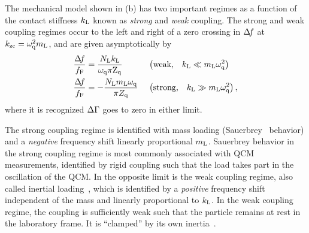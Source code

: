 The mechanical model shown in (b) has
two important regimes as a function of the contact stiffness $k_\mathrm{L}$ known
as \textit{strong} and \textit{weak} coupling.  The strong and weak
coupling regimes occur to the left and right of a zero crossing in $\Delta\!f$ at
$k_\mathrm{zc}=\omega_\mathrm{q}^2 m_\mathrm{L}$, and are given asymptotically by
\begin{align}
\frac{\Delta\!f}{f_\mathrm{F}}&=
\frac{N_\mathrm{L} k_\mathrm{L}}
{\omega_\mathrm{q}\pi \mathrm{Z}_\mathrm{q}}
&\,&\left(\text{weak,}\quad k_\mathrm{L}\ll m_\mathrm{L}
\omega_\mathrm{q}^2\right)
\label{eqn:couplinguy1}
\\
\frac{\Delta\!f}{f_\mathrm{F}}&=  -\frac{N_\mathrm{L}
m_\mathrm{L} \omega_\mathrm{q}}{\pi Z_\mathrm{q}}
&\,&\left(\text{strong,}\quad k_\mathrm{L}\gg m_\mathrm{L}
\omega_\mathrm{q}^2\right),
\label{eqn:couplinguy2}
\end{align}
where it is recognized $\Delta\Gamma$ goes to zero in either limit.

The strong coupling regime is identified with mass loading
(Sauerbrey~\cite{sauerbrey1959verwendung} behavior) and a \textit{negative}
frequency shift linearly proportional $m_\mathrm{L}$.  Sauerbrey behavior in the
strong coupling regime is most commonly associated with QCM measurements,
identified by rigid coupling such that the load takes part in the
oscillation of the QCM\@.  In the opposite limit is the weak coupling regime,
also called inertial loading~\cite{dybwad1985sensitive}, which is identified
by a \textit{positive} frequency shift independent of the mass and linearly
proportional to $k_\mathrm{L}$.  In the weak coupling regime, the coupling is
sufficiently weak such that the particle remains at rest in the laboratory
frame.  It is ``clamped'' by its own inertia~\cite{du2008role}.


